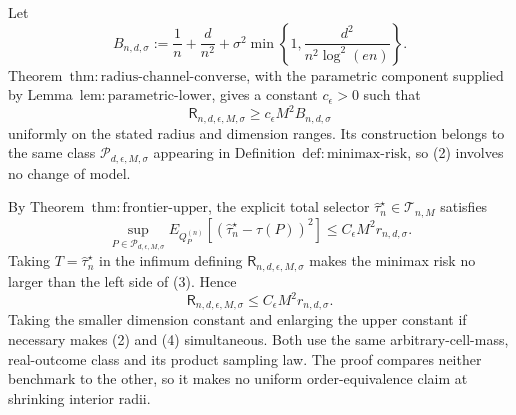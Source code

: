 Let
\[
 B_{n,d,\sigma}:=\frac1n+\frac d{n^2}
 +\sigma^2\min\left\{1,\frac{d^2}{n^2\log^2(en)}\right\}.
\tag{1}
\]
Theorem~\(\mathrm{thm:radius\text{-}channel\text{-}converse}\), with the parametric component supplied by Lemma~\(\mathrm{lem:parametric\text{-}lower}\), gives a constant \(c_{\epsilon}>0\) such that
\[
 \mathsf R_{n,d,\epsilon,M,\sigma}
 \ge c_{\epsilon}M^2 B_{n,d,\sigma}
\tag{2}
\]
uniformly on the stated radius and dimension ranges.  Its construction belongs to the same class \(\mathcal P_{d,\epsilon,M,\sigma}\) appearing in Definition~\(\mathrm{def:minimax\text{-}risk}\), so (2) involves no change of model.

By Theorem~\(\mathrm{thm:frontier\text{-}upper}\), the explicit total selector \(\widehat\tau_n^{\star}\in\mathcal T_{n,M}\) satisfies
\[
 \sup_{P\in\mathcal P_{d,\epsilon,M,\sigma}}
 E_{Q_P^{(n)}}[(\widehat\tau_n^{\star}-\tau(P))^2]
 \le C_{\epsilon}M^2r_{n,d,\sigma}.
\tag{3}
\]
Taking \(T=\widehat\tau_n^{\star}\) in the infimum defining \(\mathsf R_{n,d,\epsilon,M,\sigma}\) makes the minimax risk no larger than the left side of (3).  Hence
\[
 \mathsf R_{n,d,\epsilon,M,\sigma}
 \le C_{\epsilon}M^2r_{n,d,\sigma}.
\tag{4}
\]
Taking the smaller dimension constant and enlarging the upper constant if necessary makes (2) and (4) simultaneous.  Both use the same arbitrary-cell-mass, real-outcome class and its product sampling law.  The proof compares neither benchmark to the other, so it makes no uniform order-equivalence claim at shrinking interior radii.